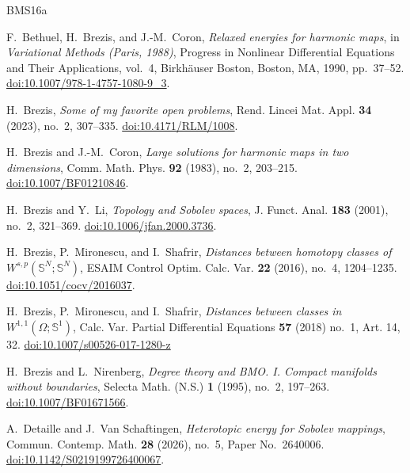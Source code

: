 \documentclass[11pt,reqno]{amsart}
\numberwithin{equation}{section}
\newcommand{\Sph}{\mathbb S}
\begin{document}
\begin{thebibliography}{BMS16a}
\small\sloppy

F.~Bethuel, H.~Brezis, and J.-M.~Coron,
\emph{Relaxed energies for harmonic maps},
in \emph{Variational Methods (Paris, 1988)},
Progress in Nonlinear Differential Equations and Their Applications, vol.~4,
Birkh\"auser Boston, Boston, MA, 1990, pp.~37--52.
\href{https://doi.org/10.1007/978-1-4757-1080-9_3}{doi:10.1007/978-1-4757-1080-9\_3}.

H.~Brezis,
\emph{Some of my favorite open problems},
Rend. Lincei Mat. Appl. \textbf{34} (2023), no.~2, 307--335.
\href{https://doi.org/10.4171/RLM/1008}{doi:10.4171/RLM/1008}.

H.~Brezis and J.-M.~Coron,
\emph{Large solutions for harmonic maps in two dimensions},
Comm. Math. Phys. \textbf{92} (1983), no.~2, 203--215.
\href{https://doi.org/10.1007/BF01210846}{doi:10.1007/BF01210846}.

H.~Brezis and Y.~Li,
\emph{Topology and Sobolev spaces},
J. Funct. Anal. \textbf{183} (2001), no.~2, 321--369.
\href{https://doi.org/10.1006/jfan.2000.3736}{doi:10.1006/jfan.2000.3736}.

H.~Brezis, P.~Mironescu, and I.~Shafrir,
\emph{Distances between homotopy classes of $W^{s,p}(\mathbb S^N;\mathbb S^N)$},
ESAIM Control Optim. Calc. Var. \textbf{22} (2016), no.~4, 1204--1235.
\href{https://doi.org/10.1051/cocv/2016037}{doi:10.1051/cocv/2016037}.

H.~Brezis, P.~Mironescu, and I.~Shafrir,
\emph{Distances between classes in $W^{1,1}(\Omega;\Sph^1)$},
Calc. Var. Partial Diﬀerential Equations \textbf{57} (2018) no.~1, Art. 14, 32. \href{https://doi.org/10.1007/s00526-017-1280-z}{doi:10.1007/s00526-017-1280-z}

H.~Brezis and L.~Nirenberg,
\emph{Degree theory and BMO. I. Compact manifolds without boundaries},
Selecta Math. (N.S.) \textbf{1} (1995), no.~2, 197--263.
\href{https://doi.org/10.1007/BF01671566}{doi:10.1007/BF01671566}.

A.~Detaille and J.~Van Schaftingen,
\emph{Heterotopic energy for Sobolev mappings},
Commun. Contemp. Math. \textbf{28} (2026), no.~5, Paper No.~2640006.
\href{https://doi.org/10.1142/S0219199726400067}{doi:10.1142/S0219199726400067}.


\end{thebibliography}
\end{document}
